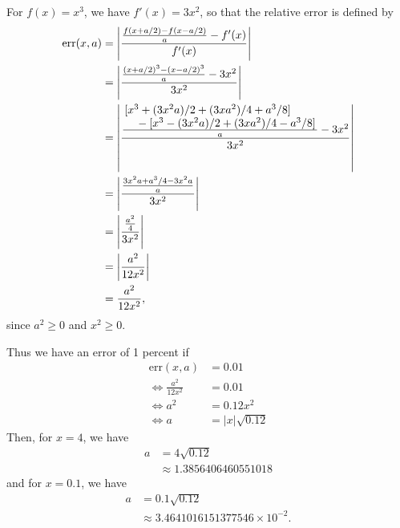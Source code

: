 
For $f(x) = x^3$, we have $f'(x) = 3x^2$, so that the relative error is defined by
\begin{equation*}
    \begin{split}
        \text{err}(x, a) &= \left| \frac{\frac{f(x + a/2) - f(x - a/2)}{a} - f'(x)}{f'(x)} \right| \\
        &= \left| \frac{\frac{(x + a/2)^3 - (x - a/2)^3}{a} - 3x^2}{3x^2} \right| \\
        &= \left| \frac{\frac{\splitfrac{[x^3 + (3x^2a)/2 + (3xa^2)/4 + a^3/8]}
            {{} - [x^3 - (3x^2a)/2 + (3xa^2)/4 - a^3/8]}}{a} - 3x^2}{3x^2} \right| \\
        &= \left| \frac{\frac{3x^2a + a^3/4 - 3x^2a}{a}}{3x^2} \right| \\
        &= \left| \frac{\frac{a^2}{4}}{3x^2} \right| \\
        &= \left| \frac{a^2}{12x^2} \right| \\
        &= \frac{a^2}{12x^2},
    \end{split}
\end{equation*}
since $a^2 \geq 0$ and $x^2 \geq 0$.\par
\qquad Thus we have an error of 1 percent if 
\begin{equation*}
    \begin{split}
        \text{err}(x, a) &= 0.01 \\
        \Leftrightarrow \frac{a^2}{12x^2} &= 0.01 \\
        \Leftrightarrow a^2 &= 0.12x^2 \\
        \Leftrightarrow a &= |x|\sqrt{0.12}
    \end{split}
\end{equation*}
\qquad Then, for $x = 4$, we have
\begin{equation*}
    \begin{split}
        a &= 4\sqrt{0.12} \\
        &\approx 1.3856406460551018
    \end{split}
\end{equation*}
and for $x = 0.1$, we have
\begin{equation*}
    \begin{split}
        a &= 0.1\sqrt{0.12} \\
        &\approx 3.4641016151377546 \times {10}^{-2}.
    \end{split}
\end{equation*}
